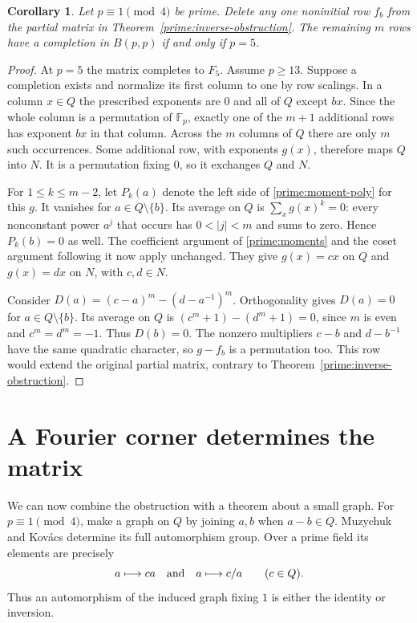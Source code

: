 \documentclass[11pt,a4paper]{article}
\newtheorem{corollary}[theorem]{Corollary}
\numberwithin{equation}{section}
\begin{document}
\begin{corollary}\label{prime:inverse-deletion}
Let $p\equiv1\pmod4$ be prime. Delete any one noninitial row $f_b$ from the partial matrix in Theorem~\ref{prime:inverse-obstruction}. The remaining $m$ rows have a completion in $B(p,p)$ if and only if $p=5$.
\end{corollary}
\begin{proof}
At $p=5$ the matrix completes to $F_5$. Assume $p\ge13$. Suppose a completion exists and normalize its first column to one by row scalings. In a column $x\in Q$ the prescribed exponents are $0$ and all of $Q$ except $bx$. Since the whole column is a permutation of $\mathbb F_p$, exactly one of the $m+1$ additional rows has exponent $bx$ in that column. Across the $m$ columns of $Q$ there are only $m$ such occurrences. Some additional row, with exponents $g(x)$, therefore maps $Q$ into $N$. It is a permutation fixing $0$, so it exchanges $Q$ and $N$.

For $1\le k\le m-2$, let $P_k(a)$ denote the left side of \eqref{prime:moment-poly} for this $g$. It vanishes for $a\in Q\setminus\{b\}$. Its average on $Q$ is $\sum_x g(x)^k=0$: every nonconstant power $a^j$ that occurs has $0<|j|<m$ and sums to zero. Hence $P_k(b)=0$ as well. The coefficient argument of \eqref{prime:moments} and the coset argument following it now apply unchanged. They give $g(x)=cx$ on $Q$ and $g(x)=dx$ on $N$, with $c,d\in N$.

Consider $D(a)=(c-a)^m-(d-a^{-1})^m$. Orthogonality gives $D(a)=0$ for $a\in Q\setminus\{b\}$. Its average on $Q$ is $(c^m+1)-(d^m+1)=0$, since $m$ is even and $c^m=d^m=-1$. Thus $D(b)=0$. The nonzero multipliers $c-b$ and $d-b^{-1}$ have the same quadratic character, so $g-f_b$ is a permutation too. This row would extend the original partial matrix, contrary to Theorem~\ref{prime:inverse-obstruction}.
\end{proof}

\section{A Fourier corner determines the matrix}\label{sec:corner}

We can now combine the obstruction with a theorem about a small graph. For $p\equiv1\pmod4$, make a graph on $Q$ by joining $a,b$ when $a-b\in Q$. Muzychuk and Kov\'acs \cite{mk} determine its full automorphism group. Over a prime field its elements are precisely
$$a\longmapsto ca\quad\hbox{and}\quad a\longmapsto c/a\qquad(c\in Q).$$
Thus an automorphism of the induced graph fixing $1$ is either the identity or inversion.
\end{document}
